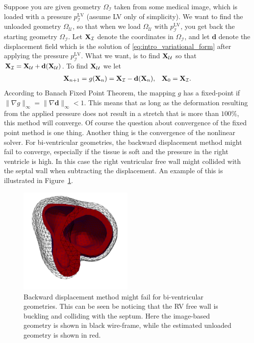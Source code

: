 Suppose you are given geometry $\Omega_{\mathcal{I}}$ taken from some
medical image, which is loaded with a pressure $p_{\mathcal{I}}^{\mathrm{LV}}$ (assume LV only of
simplicity). We want to find the unloaded geometry 
$\Omega_{\mathcal{U}}$, so that when we load $\Omega_{\mathcal{U}}$ with $p_{\mathcal{I}}^{\mathrm{LV}}$,
you get back the starting geometry $\Omega_{\mathcal{I}}$. Let
$\mathbf{X}_{\mathcal{I}}$ denote the coordinates in $\Omega_{\mathcal{I}}$, and
let $\mathbf{d}$ denote the displacement field which is the solution
of \eqref{eq:intro_variational_form} after applying the pressure
$p_{\mathcal{I}}^{\mathrm{LV}}$. What we want, is to find
$\mathbf{X}_{\mathcal{U}}$ so that $\mathbf{X}_{\mathcal{I}} =
\mathbf{X}_{\mathcal{U}} + \mathbf{d}(\mathbf{X}_{\mathcal{U}})$. To find
$\mathbf{X}_{\mathcal{U}}$ we let 
\begin{align}
  \mathbf{X}_{n+1} = g(\mathbf{X}_n) =  \mathbf{X}_{\mathcal{I}} - \mathbf{d}(\mathbf{X}_n),
  && \mathbf{X}_0 = \mathbf{X}_{\mathcal{I}}.
\end{align}
According to Banach Fixed Point Theorem, the mapping $g$ has a
fixed-point if $\| \nabla g \|_{\infty} = \| \nabla \mathbf{d}
\|_{\infty} < 1$. This means that as long as the deformation
resulting from the applied pressure does not result in a stretch that
is more than $100 \%$, this method will converge. Of course the
question about convergence of the fixed point method is one
thing. Another thing is the convergence of the nonlinear solver.
For bi-ventricular geometries, the backward displacement method might
fail to converge, especially if the tissue is soft and the pressure in
the right ventricle is high. In this case the
right ventricular free wall might collided with the septal wall when
subtracting the displacement. An example of this is illustrated in
Figure~\ref{fig:unloading_fail}.


\begin{figure}[htbp]
  \centering
    \includegraphics[width=0.5\textwidth]{chapters/introduction/figures/unloading_fail/unloading_fail.png}
\caption{Backward displacement method might fail for bi-ventricular
  geometries. This can be seen be noticing that the RV free wall is
  buckling and colliding with the septum. Here the image-based
  geometry is shown in black wire-frame, while the estimated unloaded
geometry is shown in red.}
\label{fig:unloading_fail}
\end{figure}


